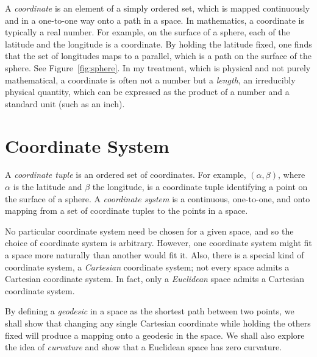 A \emph{coordinate} is an element of a simply ordered set,
which is mapped continuously and in a one-to-one way onto a path in a space.
In mathematics, a coordinate is typically a real number.  For example, on the
surface of a sphere, each of the latitude and the longitude is a coordinate.
By holding the latitude fixed, one finds that the set of longitudes maps to a
parallel, which is a path on the surface of the sphere.  See
Figure~\ref{fig:sphere}.  In my treatment, which is physical and not purely
mathematical, a coordinate is often not a number but a \emph{length}, an
irreducibly physical quantity, which can be expressed as the product of a
number and a standard unit (such as an inch).

\section{Coordinate System}

A \emph{coordinate tuple} is an ordered set of coordinates.  For example,
$(\alpha,\beta)$, where $\alpha$ is the latitude and $\beta$ the longitude, is
a coordinate tuple identifying a point on the surface of a sphere.  A
\emph{coordinate system} is a continuous, one-to-one, and onto mapping from a
set of coordinate tuples to the points in a space.

No particular coordinate system need be chosen for a given space, and so the
choice of coordinate system is arbitrary.  However, one coordinate system might
fit a space more naturally than another would fit it.  Also, there is a special
kind of coordinate system, a \emph{Cartesian} coordinate system; not every
space admits a Cartesian coordinate system.  In fact, only a \emph{Euclidean}
space admits a Cartesian coordinate system.

By defining a \emph{geodesic} in a space as the shortest path between two
points, we shall show that changing any single Cartesian coordinate while
holding the others fixed will produce a mapping onto a geodesic in the space.
We shall also explore the idea of \emph{curvature} and show that a Euclidean
space has zero curvature.

